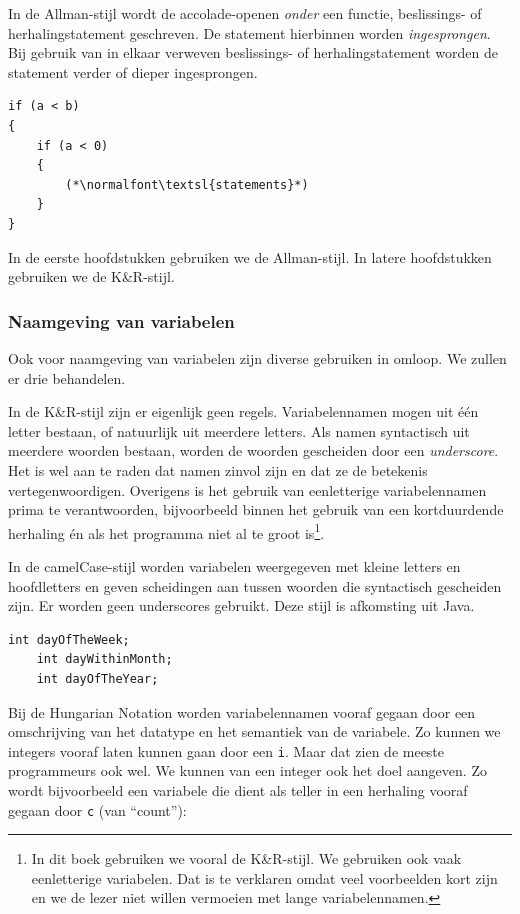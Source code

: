 In de Allman-stijl wordt de accolade-openen \textsl{onder} een functie, beslissings- of herhalingstatement geschreven. De statement hierbinnen worden \textsl{ingesprongen}. Bij gebruik van in elkaar verweven beslissings- of herhalingstatement worden de statement verder of dieper ingesprongen.

\begin{lstlisting}[caption=Allman-stijl.]
if (a < b)
{
    if (a < 0)
    {
        (*\normalfont\textsl{statements}*)
    }
}
\end{lstlisting}

In de eerste hoofdstukken gebruiken we de Allman-stijl. In latere hoofdstukken gebruiken we de K\&R-stijl.

\subsubsection*{Naamgeving van variabelen}

Ook voor naamgeving van variabelen zijn diverse gebruiken in omloop. We zullen er drie behandelen.

In de K\&R-stijl zijn er eigenlijk geen regels. Variabelennamen mogen uit één letter bestaan, of natuurlijk uit meerdere letters. Als namen syntactisch uit meerdere woorden bestaan, worden de woorden gescheiden door een \textsl{underscore}. Het is wel aan te raden dat namen zinvol zijn en dat ze de betekenis vertegenwoordigen. Overigens is het gebruik van eenletterige variabelennamen prima te verantwoorden, bijvoorbeeld binnen het gebruik van een kortduurdende herhaling én als het programma niet al te groot is\footnote{In dit boek gebruiken we vooral de K\&R-stijl. We gebruiken ook vaak eenletterige variabelen. Dat is te verklaren omdat veel voorbeelden kort zijn en we de lezer niet willen vermoeien met lange variabelennamen.}.

In de camelCase-stijl worden variabelen weergegeven met kleine letters en hoofdletters en geven scheidingen aan tussen woorden die syntactisch gescheiden zijn. Er worden geen underscores gebruikt. Deze stijl is afkomsting uit Java.

\begin{lstlisting}[caption=camelCase-stijl.]
    int dayOfTheWeek;
    int dayWithinMonth;
    int dayOfTheYear;
\end{lstlisting}

Bij de Hungarian Notation worden variabelennamen vooraf gegaan door een omschrijving van het datatype en het semantiek van de variabele. Zo kunnen we integers vooraf laten kunnen gaan door een \lstinline|i|. Maar dat zien de meeste programmeurs ook wel. We kunnen van een integer ook het doel aangeven. Zo wordt bijvoorbeeld een variabele die dient als teller in een herhaling vooraf gegaan door \lstinline|c| (van ``count''):

